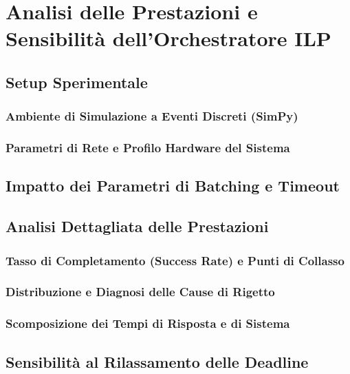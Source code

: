 \chapter{Analisi delle Prestazioni e Sensibilità dell'Orchestratore ILP}
\label{chap:analisi_prestazioni}

\section{Setup Sperimentale}
\subsection{Ambiente di Simulazione a Eventi Discreti (SimPy)}
\subsection{Parametri di Rete e Profilo Hardware del Sistema}

\section{Impatto dei Parametri di Batching e Timeout}

\section{Analisi Dettagliata delle Prestazioni}
\subsection{Tasso di Completamento (Success Rate) e Punti di Collasso}
\subsection{Distribuzione e Diagnosi delle Cause di Rigetto}
\subsection{Scomposizione dei Tempi di Risposta e di Sistema}

\section{Sensibilità al Rilassamento delle Deadline}